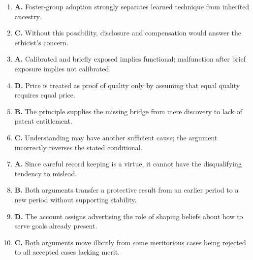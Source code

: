 \begin{enumerate}
\item \textbf{A.} Foster-group adoption strongly separates learned technique from inherited ancestry.
\item \textbf{C.} Without this possibility, disclosure and compensation would answer the ethicist's concern.
\item \textbf{A.} Calibrated and briefly exposed implies functional; malfunction after brief exposure implies not calibrated.
\item \textbf{D.} Price is treated as proof of quality only by assuming that equal quality requires equal price.
\item \textbf{B.} The principle supplies the missing bridge from mere discovery to lack of patent entitlement.
\item \textbf{C.} Understanding may have another sufficient cause; the argument incorrectly reverses the stated conditional.
\item \textbf{A.} Since careful record keeping is a virtue, it cannot have the disqualifying tendency to mislead.
\item \textbf{B.} Both arguments transfer a protective result from an earlier period to a new period without supporting stability.
\item \textbf{D.} The account assigns advertising the role of shaping beliefs about how to serve goals already present.
\item \textbf{C.} Both arguments move illicitly from some meritorious cases being rejected to all accepted cases lacking merit.
\end{enumerate}

\endgroup
